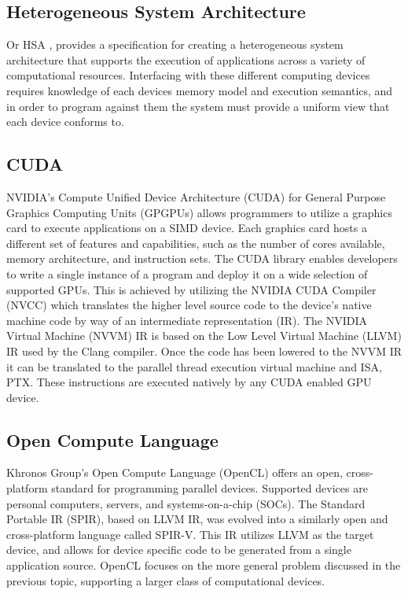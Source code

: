 \subsection{Heterogeneous System Architecture}
\label{related:hsa}
Or HSA \cite{hsa}, provides a specification for creating a heterogeneous
system architecture that supports the execution of applications across a
variety of computational resources. Interfacing with these different computing
devices requires knowledge of each devices memory model and execution
semantics, and in order to program against them the system must provide a
uniform view that each device conforms to.

\subsection{CUDA}
\label{related:cuda}
NVIDIA's Compute Unified Device Architecture (CUDA) \cite{cuda} for General
Purpose Graphics Computing Units (GPGPUs) allows programmers to utilize a
graphics card to execute applications on a SIMD device. Each graphics card
hosts a different set of features and capabilities, such as the number of cores
available, memory architecture, and instruction sets. The CUDA library
enables developers to write a single instance of a program and deploy
it on a wide selection of supported GPUs. This is achieved by utilizing the
NVIDIA CUDA Compiler (NVCC) which translates the higher level source code
to the device's native machine code by way of an intermediate representation
(IR). The NVIDIA Virtual Machine (NVVM) IR is based on the Low Level Virtual
Machine (LLVM) IR used by the Clang compiler. Once the code has been lowered
to the NVVM IR it can be translated to the parallel thread execution virtual
machine and ISA, PTX. These instructions are executed natively by any CUDA
enabled GPU device.

\subsection{Open Compute Language}
\label{related:ocl}
Khronos Group's Open Compute Language (OpenCL) \cite{opencl} offers an open,
cross-platform standard for programming parallel devices. Supported devices are
personal computers, servers, and systems-on-a-chip (SOCs). The Standard
Portable IR (SPIR), based on LLVM IR, was evolved into a similarly open and
cross-platform language called SPIR-V. This IR utilizes LLVM as the target
device, and allows for device specific code to be generated from a single
application source. OpenCL focuses on the more general problem discussed in
the previous topic, supporting a larger class of computational devices.

